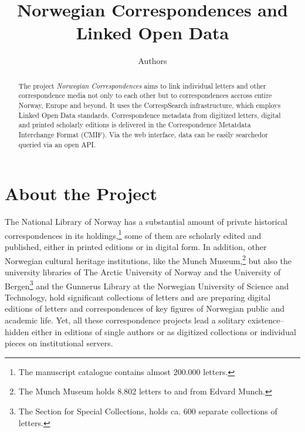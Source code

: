 \documentclass[runningheads]{llncs}
\begin{document}
%
\title{Norwegian Correspondences and\\Linked Open Data}
%
%
\author{Authors}
%
%

%
\maketitle              %
%
\begin{abstract}
The project \textit{Norwegian Correspondences} aims to link individual letters and other correspondence media not only to each other but to correspondences accross entire Norway, Europe and beyond. It uses the CorrespSearch infrastructure, which employs Linked
Open Data standards. Correspondence metadata from digitized letters, digital and printed scholarly editions is delivered in the Correspondence Metatdata Interchange Format (CMIF). Via the web interface, data can be easily searched\textemdash or queried via an open API. 

\end{abstract}
%
\section{About the Project}
The National Library of Norway has a substantial amount of private
historical correspondences in its
holdings,\footnote{The manuscript catalogue contains almost 200.000 letters.} some of them are scholarly
edited and published, either in printed editions or in digital form. In
addition, other Norwegian cultural heritage institutions, like the Munch
Museum,\footnote{The Munch Museum holds 8.802 letters to and from Edvard Munch.} but also the university
libraries of The Arctic University of
Norway and the University of
Bergen\footnote{The Section for Special Collections, holds
ca. 600 separate collections of letters.} and the Gunnerus Library at
the Norwegian University of Science and
Technology, hold significant
collections of letters and are preparing digital editions of letters and
correspondences of key figures of Norwegian public and academic life.
Yet, all these correspondence projects lead a solitary existence--hidden
either in editions of single authors or as digitized collections or
individual pieces on institutional servers.
\end{document}
